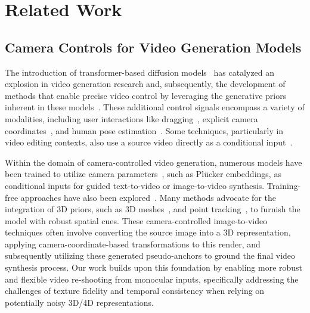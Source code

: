 \section{Related Work}
\label{sec:related_work}

\subsection{Camera Controls for Video Generation Models}
The introduction of transformer-based diffusion models~\cite{peebles2023scalable,wan21,moviegen,seedance1,cogvideox} has catalyzed an explosion in video generation research and, subsequently, the development of methods that enable precise video control by leveraging the generative priors inherent in these models~\cite{vid_ctrl_fu20243dtrajmaster,vid_ctrl_guo2024sparsectrl,vid_ctrl_xing2024make,vid_ctrl_yin2023dragnuwa}. These additional control signals encompass a variety of modalities, including user interactions like dragging~\cite{drag_geng2025motion,drag_jeong2024dreammotion,drag_jeong2024vmc,drag_zhao2024motiondirector}, explicit camera coordinates~\cite{camera_traj_he2024cameractrl,camera_traj_wang2024motionctrl,camera_traj_xiao2024trajectory,camera_traj_xu2024camco,camera_traj_yang2024direct,camera_traj_you2024nvs,camera_traj_zhang2025recapture}, and human pose estimation~\cite{human_animate_cheng2025wan,human_animate_gan2025humandit,human_animate_qin2023dancing,human_animate_wang2025unianimate}. Some techniques, particularly in video editing contexts, also use a source video directly as a conditional input~\cite{video_edit_cohen2024slicedit,video_edit_ouyang2024i2vedit,video_edit_wang2025videodirector}.

Within the domain of camera-controlled video generation, numerous models have been trained to utilize camera parameters~\cite{camera_traj_he2024cameractrl,gcd}, such as Plücker embeddings, as conditional inputs for guided text-to-video or image-to-video synthesis. Training-free approaches have also been explored~\cite{watson2022novel}. Many methods advocate for the integration of 3D priors, such as 3D meshes~\cite{bai2025recammaster,ex4d,yu2025trajectorycrafter}, and point tracking~\cite{wang2025epic,jeong2025reangle}, to furnish the model with robust spatial cues. These camera-controlled image-to-video techniques often involve converting the source image into a 3D representation, applying camera-coordinate-based transformations to this render, and subsequently utilizing these generated pseudo-anchors to ground the final video synthesis process. Our work builds upon this foundation by enabling more robust and flexible video re-shooting from monocular inputs, specifically addressing the challenges of texture fidelity and temporal consistency when relying on potentially noisy 3D/4D representations.

